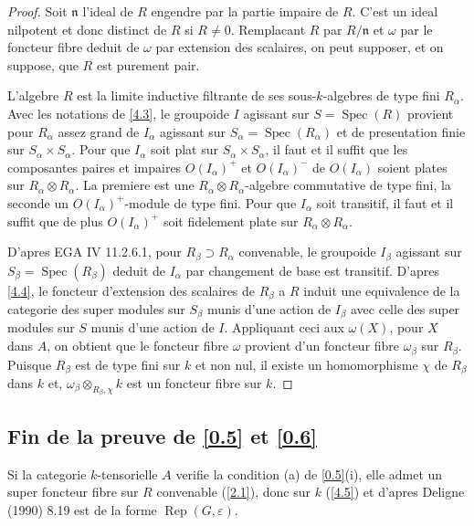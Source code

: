 \documentclass[11pt,a4paper]{article}
\theoremstyle{plain}
\theoremstyle{definition}
\DeclareMathOperator{\Spec}{Spec}
\newcommand{\Rep}{\operatorname{Rep}}
\begin{document}
\begin{proof}
Soit $\mathfrak{n}$ l'ideal de $R$ engendre par la partie impaire de $R$. C'est un ideal nilpotent et donc distinct de $R$ si $R\neq0$. Remplacant $R$ par $R/\mathfrak{n}$ et $\omega$ par le foncteur fibre deduit de $\omega$ par extension des scalaires, on peut supposer, et on suppose, que $R$ est purement pair.

L'algebre $R$ est la limite inductive filtrante de ses sous-$k$-algebres de type fini $R_\alpha$. Avec les notations de \ref{4.3}, le groupoide $I$ agissant sur $S=\Spec(R)$ provient pour $R_\alpha$ assez grand de $I_\alpha$ agissant sur $S_\alpha=\Spec(R_\alpha)$ et de presentation finie sur $S_\alpha\times S_\alpha$. Pour que $I_\alpha$ soit plat sur $S_\alpha\times S_\alpha$, il faut et il suffit que les composantes paires et impaires $O(I_\alpha)^+$ et $O(I_\alpha)^-$ de $O(I_\alpha)$ soient plates sur $R_\alpha\otimes R_\alpha$. La premiere est une $R_\alpha\otimes R_\alpha$-algebre commutative de type fini, la seconde un $O(I_\alpha)^+$-module de type fini. Pour que $I_\alpha$ soit transitif, il faut et il suffit que de plus $O(I_\alpha)^+$ soit fidelement plate sur $R_\alpha\otimes R_\alpha$.

D'apres EGA IV 11.2.6.1, pour $R_\beta\supset R_\alpha$ convenable, le groupoide $I_\beta$ agissant sur $S_\beta=\Spec(R_\beta)$ deduit de $I_\alpha$ par changement de base est transitif. D'apres \ref{4.4}, le foncteur d'extension des scalaires de $R_\beta$ a $R$ induit une equivalence de la categorie des super modules sur $S_\beta$ munis d'une action de $I_\beta$ avec celle des super modules sur $S$ munis d'une action de $I$. Appliquant ceci aux $\omega(X)$, pour $X$ dans $A$, on obtient que le foncteur fibre $\omega$ provient d'un foncteur fibre $\omega_\beta$ sur $R_\beta$. Puisque $R_\beta$ est de type fini sur $k$ et non nul, il existe un homomorphisme $\chi$ de $R_\beta$ dans $k$ et, $\omega_\beta\otimes_{R_\beta,\chi}k$ est un foncteur fibre sur $k$.
\end{proof}

\subsection{Fin de la preuve de \ref{0.5} et \ref{0.6}}\label{4.6}

Si la categorie $k$-tensorielle $A$ verifie la condition (a) de \ref{0.5}(i), elle admet un super foncteur fibre sur $R$ convenable (\ref{2.1}), donc sur $k$ (\ref{4.5}) et d'apres Deligne (1990) 8.19 est de la forme $\Rep(G,\varepsilon)$.
\end{document}
